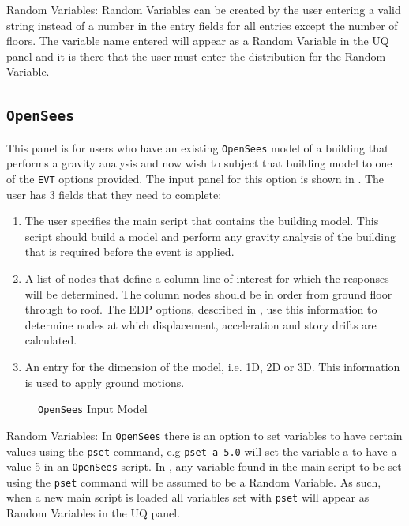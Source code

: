Random Variables: Random Variables can be created by the user entering
a valid string instead of a number in the entry fields for all entries
except the number of floors. The variable name entered will appear as
a Random Variable in the UQ panel and it is there that the user must
enter the distribution for the Random Variable.

\subsection{\texttt{OpenSees}}
This panel is for users who have an existing \texttt{OpenSees} model of a
building that performs a gravity analysis and now wish to subject that
building model to one of the \texttt{EVT} options provided. The input panel
for this option is shown in . The user has 3 fields
that they need to complete:
\begin{enumerate} 
\item The user specifies the main script that contains the building
  model. This script should build a model and perform any gravity
  analysis of the building that is required before the event is
  applied.
\item A list of nodes that define a column line of interest for which
  the responses will be determined. The column nodes should be in
  order from ground floor through to roof. The EDP options, described
  in , use this information to determine nodes at which
  displacement, acceleration and story drifts are calculated.
\item An entry for the dimension of the model, i.e. 1D, 2D or 3D. This
  information is used to apply ground motions.
\end{enumerate}

\begin{figure}[!htbp]
  \caption{\texttt{OpenSees} Input Model}
  \label{fig:figure3}
\end{figure}

Random Variables: In \texttt{OpenSees} there is an option to set
variables to have certain values using the \texttt{pset} command, e.g
\texttt{pset a 5.0} will set the variable a to have a value 5 in an
\texttt{OpenSees} script. In \texttt{\getsoftwarename{}}, any variable
found in the main script to be set using the \texttt{pset} command
will be assumed to be a Random Variable. As such, when a new main
script is loaded all variables set with \texttt{pset} will appear as
Random Variables in the UQ panel.
